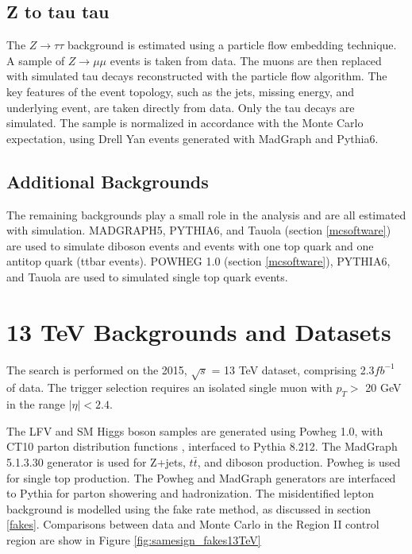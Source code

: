 \documentclass[oneside, letterpaper, oldfontcommands]{memoir}
\begin{document}
\subsection{Z to tau tau}
\qquad The $Z \rightarrow \tau\tau$ background is estimated using a particle flow embedding technique\cite{CMS-PAS-HIG-12-018}. A sample of $Z \rightarrow \mu\mu$ events is taken from data. The muons are then replaced with simulated tau decays reconstructed with the particle flow algorithm. The key features of the event topology, such as the jets, missing energy, and underlying event, are taken directly from data. Only the tau decays are simulated. The sample is normalized in accordance with the Monte Carlo expectation, using Drell Yan events generated with {\sc MadGraph}\cite{Alwall:2011uj} and {\sc Pythia}6\cite{Sjostrand:2006za}.

\subsection{Additional Backgrounds}\label{addback}
\qquad The remaining backgrounds play a small role in the analysis and are all estimated with simulation. MADGRAPH5, PYTHIA6, and Tauola (section \ref{mcsoftware}) are used to simulate diboson events and events with one top quark and one antitop quark (ttbar events). POWHEG 1.0 (section \ref{mcsoftware}), PYTHIA6, and Tauola are used to simulated single top quark events.

\section{13 TeV Backgrounds and Datasets}

\qquad The search is performed on the 2015, $\sqrt{s}$ = 13 TeV dataset, comprising 2.3$fb^{-1}$ of data. The trigger selection requires an isolated single muon with $p_{T} >$ 20 GeV in the range $|\eta| < 2.4$.

\qquad The LFV and SM Higgs boson samples are generated using {\sc Powheg} 1.0, with CT10 parton distribution functions \cite{Guzzi:2011sv}, interfaced to {\sc Pythia} 8.212\cite{Sjostrand:2014zea}. The {\sc MadGraph} 5.1.3.30 \cite{Alwall:2011uj} generator is used for Z+jets, $t\bar{t}$, and diboson production. {\sc Powheg} is used for single top production. The {\sc Powheg} and {\sc MadGraph} generators are interfaced to {\sc Pythia} for parton showering and hadronization. The misidentified lepton background is modelled using the fake rate method, as discussed in section \ref{fakes}. Comparisons between data and Monte Carlo in the Region II control region are show in Figure \ref{fig:samesign_fakes13TeV} 
\end{document}
